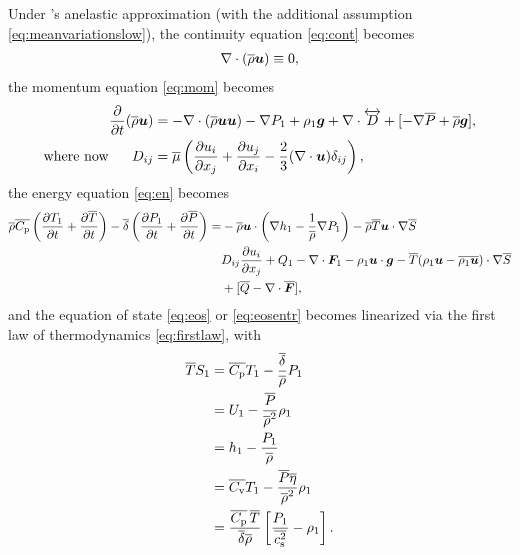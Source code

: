 \documentclass[12pt]{article}
\newcommand{\vecf}{\bm{F}}
\begin{document}
	Under \citet{Gough1969}'s anelastic approximation (with the additional assumption \eqref{eq:meanvariationslow}), the continuity equation \eqref{eq:cont} becomes
	\begin{align}\label{eq:ancont}
		\nabla\cdot(\overline{\rho}\bm{u})\equiv 0,
	\end{align}
	the momentum equation \eqref{eq:mom} becomes 
	\begin{subequations}\label{eq:anmom}
	\begin{align}
		\frac{\partial}{\partial t}(\overline{\rho}\bm{u})&=-\nabla\cdot(\overline{\rho}\bm{u}\bm{u}) - \nabla P_1 +\rho_1\bm{g} +\nabla\cdot \overleftrightarrow{D}+[-\nabla\overline{P} + \overline{\rho}\bm{g}],\label{eq:anmommain}\\
		\text{where now}\ \ \ \ \  D_{ij}& = \overline{\mu}\left(\frac{\partial u_i}{\partial x_j} + \frac{\partial u_j}{\partial x_i} - \frac{2}{3}(\nabla\cdot\bm{u})\delta_{ij}\right)\label{eq:anmomvisc},
	\end{align}
	\end{subequations}
	the energy equation \eqref{eq:en} becomes 
	\begin{align}\label{eq:anen}
		\rhoover\cpover\left(\pderiv{\tmpone}{t}+\pderiv{\tmpover}{t}\right)- \deltaover\left(\pderiv{\prsone}{t} + \pderiv{\prsover}{t}\right) = &-\rhoover\vecu\cdot\left(\nabla \enthone-\frac{1}{\rhoover}\nabla \prsone\right) - \rhoover \tmpover \ugrad \entrover\nonumber\\
		& D_{ij}\pderiv{u_i}{x_j} + Q _1- \Div\vecf_1 -\rhoone\vecu\cdot\vecg - \tmpover(\rhoone\vecu-\overline{\rhoone\vecu})\cdot\nabla\entrover\nonumber\\
		&+ [\heatover - \Div\overline{\vecf}],
	\end{align}
  and the equation of state \eqref{eq:eos} or \eqref{eq:eosentr} becomes linearized via the first law of thermodynamics \eqref{eq:firstlaw}, with
  \begin{subequations}\label{eq:anfirstlawpert}
  \begin{align}
  	\overline{T} S_1 &= \overline{C_{\rm{p}}} T_1 - \frac{\overline{\delta}}{\overline{\rho}} P_1\label{eq:anfirstlawperttmpprs}\\
  	&= U_1 - \frac{\overline{P}}{\overline{\rho}^2}\rho_1 \label{eq:anfirstlawpertinterho}\\
  	&= h_1 - \frac{P_1}{\overline{\rho}}\label{eq:anfirstlawpertenthprs}\\
  	&= \overline{C_{\rm{v}}} T_1 - \frac{\overline{P}\overline{\eta}}{\overline{\rho}^2}\rho_1\label{eq:anfirstlawperttmprho}\\		
  	&= \frac{\overline{C_{\rm{p}}}\, \overline{T}}{\overline{\delta}\overline{\rho}}\left[\frac{P_1}{\overline{c_{\rm s}^2}}-\rho_1\right].\label{eq:anfirstlawpertprsrho}
  \end{align}
  \end{subequations}
\end{document}
